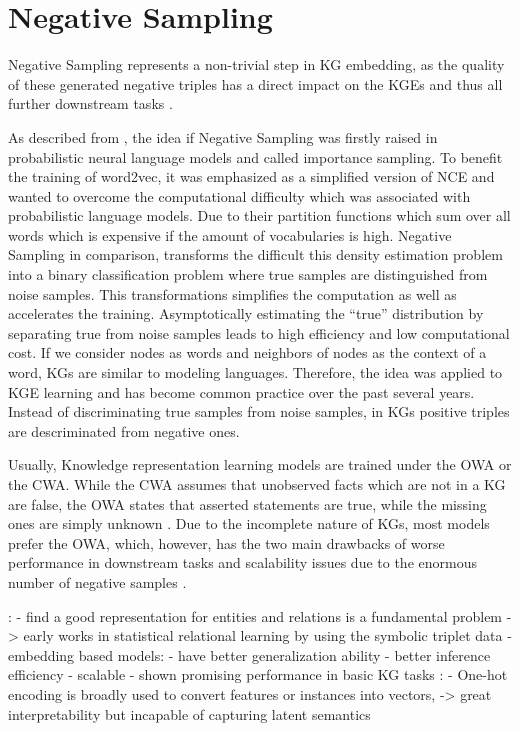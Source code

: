 \section{Negative Sampling}
\label{sec:negative_sampling}

Negative Sampling represents a non-trivial step in \ac{KG} embedding, as the quality of these generated negative triples has a direct impact on the \acp{KGE} and thus all further downstream tasks \cite{qiannegative}.

As described from \cite{qianunderstanding}, the idea if Negative Sampling was firstly raised in probabilistic neural language models and called importance sampling. 
To benefit the training of word2vec, it was emphasized as a simplified version of \ac{NCE}  and wanted to overcome the computational difficulty which was associated with probabilistic language models.
Due to their partition functions which sum over all words which is expensive if the amount of vocabularies is high.
Negative Sampling in comparison, transforms the difficult this density estimation problem into a binary classification problem where true samples are distinguished from noise samples.
This transformations simplifies the computation as well as accelerates the training.
Asymptotically estimating the “true” distribution by separating true from noise samples leads to high efficiency and low computational cost.
If we consider nodes as words and neighbors of nodes as the context of a word, \acp{KG} are similar to modeling languages.
Therefore, the idea was applied to \ac{KGE} learning and has become common practice over the past several years.
Instead of discriminating true samples from noise samples, in \acp{KG} positive triples are descriminated from negative ones.

Usually, Knowledge representation learning models are trained under the \ac{OWA} or the \ac{CWA}.
While the \ac{CWA} assumes that unobserved facts which are not in a \ac{KG} are false, the \ac{OWA} states that asserted statements are true, while the missing ones are simply unknown \cite{arnaout2020enriching, qiannegative}.
Due to the incomplete nature of \acp{KG}, most models prefer the \ac{OWA}, which, however, has the two main drawbacks of worse performance in downstream tasks and scalability issues due to the enormous number of negative samples \cite{qiannegative}.

















\cite{zhang2021efficient}:
- find a good representation for entities and relations is a fundamental problem
-> early works in statistical relational learning by using the symbolic triplet data
- embedding based models:
    - have better generalization ability
    - better inference efficiency
    - scalable
    - shown promising performance in basic KG tasks
\cite{qianunderstanding}:
- One-hot encoding is broadly used to convert features or instances into vectors,
-> great interpretability but incapable of capturing latent semantics
